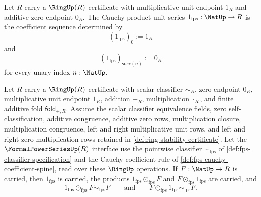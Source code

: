 \begin{definition}
\label{def:fps-cauchy-product-unit-series}
Let $R$ carry a $\RingUp(R)$ certificate with multiplicative unit endpoint $1_R$ and additive zero endpoint $0_R$. The Cauchy-product unit series $1_{\mathrm{fps}}:\NatUp\to R$ is the coefficient sequence determined by
$$
(1_{\mathrm{fps}})_0:=1_R
$$
and
$$
(1_{\mathrm{fps}})_{\mathsf{succ}(n)}:=0_R
$$
for every unary index $n:\NatUp$.
\end{definition}

\begin{theorem}
\label{thm:fps-cauchy-product-unit-laws}
Let $R$ carry a $\RingUp(R)$ certificate with scalar classifier $\sim_R$, zero endpoint $0_R$, multiplicative unit endpoint $1_R$, addition $+_R$, multiplication $\cdot_R$, and finite additive fold $\mathsf{fold}_{+,R}$. Assume the scalar classifier equivalence fields, zero self-classification, additive congruence, additive zero rows, multiplication closure, multiplication congruence, left and right multiplicative unit rows, and left and right zero multiplication rows retained in \autoref{def:ring-stability-certificate}. Let the $\FormalPowerSeriesUp(R)$ interface use the pointwise classifier $\sim_{\mathrm{fps}}$ of \autoref{def:fps-classifier-specification} and the Cauchy coefficient rule of \autoref{def:fps-cauchy-coefficient-spine}, read over these $\RingUp$ operations. If $F:\NatUp\to R$ is carried, then $1_{\mathrm{fps}}$ is carried, the products $1_{\mathrm{fps}}\odot_{\mathrm{fps}}F$ and $F\odot_{\mathrm{fps}}1_{\mathrm{fps}}$ are carried, and
$$
1_{\mathrm{fps}}\odot_{\mathrm{fps}}F\sim_{\mathrm{fps}}F
\qquad\text{and}\qquad
F\odot_{\mathrm{fps}}1_{\mathrm{fps}}\sim_{\mathrm{fps}}F.
$$
\end{theorem}
